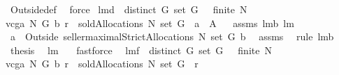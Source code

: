 \begin{isabellebody}
\ Outside{\isacharunderscore}def\ \isamarkupfalse%
\ force%
\endisatagproof
{\isafoldproof}%
%
\isadelimproof
\isanewline
%
\endisadelimproof
\isanewline
{}\isamarkupfalse%
\ lm{}{}d{\isacharcolon}\ \ {\isachardoublequoteopen}distinct\ G{\isachardoublequoteclose}\ {\isachardoublequoteopen}set\ G\ {\isasymnoteq}\ {\isacharbraceleft}{\isacharbraceright}{\isachardoublequoteclose}\ {\isachardoublequoteopen}finite\ N{\isachardoublequoteclose}\ \ \isanewline
{\isachardoublequoteopen}vcga{\isacharprime}\ N\ G\ b\ r\ {\isasymin}\ soldAllocations\ N\ {\isacharparenleft}set\ G{\isacharparenright}{\isachardoublequoteclose}\ {\isacharparenleft}\ {\isachardoublequoteopen}{\isacharquery}a\ {\isasymin}\ {\isacharquery}A{\isachardoublequoteclose}{\isacharparenright}%
\isadelimproof
\ %
\endisadelimproof
%
\isatagproof
{}\isamarkupfalse%
\ assms\ lm{}{}b\ lm{}{}\ \isanewline
{}\isamarkupfalse%
\ {\isacharminus}\ \isamarkupfalse%
\ {\isachardoublequoteopen}{\isacharquery}a\ {\isasymin}\ {\isacharparenleft}Outside{\isacharprime}\ {\isacharbraceleft}seller{\isacharbraceright}{\isacharparenright}{\isacharbackquote}{\isacharparenleft}maximalStrictAllocations{\isacharprime}\ N\ {\isacharparenleft}set\ G{\isacharparenright}\ b{\isacharparenright}{\isachardoublequoteclose}\ \isanewline
{}\isamarkupfalse%
\ assms\ \isamarkupfalse%
\ {\isacharparenleft}rule\ lm{}{}b{\isacharparenright}\ \isamarkupfalse%
\ {\isacharquery}thesis\ \isamarkupfalse%
\ lm{}{}\ \ \isamarkupfalse%
\ fastforce\ \isamarkupfalse%
%
\endisatagproof
{\isafoldproof}%
%
\isadelimproof
%
\endisadelimproof
\isanewline
{}\isamarkupfalse%
\ lm{}{}f{\isacharcolon}\ \ {\isachardoublequoteopen}distinct\ G{\isachardoublequoteclose}\ {\isachardoublequoteopen}set\ G\ {\isasymnoteq}\ {\isacharbraceleft}{\isacharbraceright}{\isachardoublequoteclose}\ {\isachardoublequoteopen}finite\ N{\isachardoublequoteclose}\ \ \isanewline
{\isachardoublequoteopen}vcga\ N\ G\ b\ r\ {\isasymin}\ soldAllocations\ N\ {\isacharparenleft}set\ G{\isacharparenright}{\isachardoublequoteclose}\ {\isacharparenleft}\ {\isachardoublequoteopen}{\isacharunderscore}{\isasymin}{\isacharquery}r{\isachardoublequoteclose}{\isacharparenright}\ \isanewline

\end{isabellebody}
